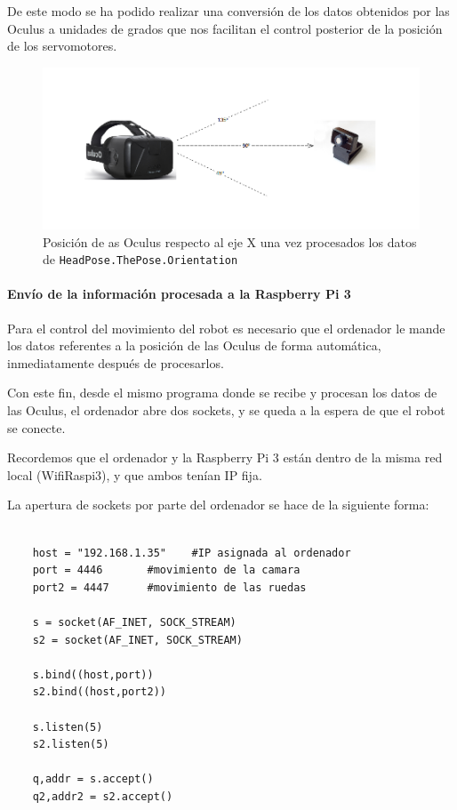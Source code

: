 \documentclass[twoside, 11pt]{epstfg}
\begin{document}
De este modo se ha podido realizar una conversión de los datos obtenidos por las Oculus a unidades de grados que nos facilitan el control posterior de la posición de los servomotores.

\begin{figure}[h!]
	\centerline{
		\mbox{\includegraphics[width=.80\textwidth]{images/Oculusgrados2.png}}
	}
	\caption{Posición de as Oculus respecto al eje X una vez procesados los datos de \texttt{HeadPose.ThePose.Orientation}}
\end{figure}
\newpage
\paragraph{Envío de la información procesada a la Raspberry Pi 3}



Para el control del movimiento del robot es necesario que el ordenador le mande los datos referentes a la posición de las Oculus de forma automática, inmediatamente después de procesarlos.

Con este fin, desde el mismo programa donde se recibe y procesan los datos de las Oculus, el ordenador abre dos sockets, y se queda a la espera de que el robot se conecte.

Recordemos que el ordenador y la Raspberry Pi 3 están dentro de la misma red local (WifiRaspi3), y que ambos tenían IP fija.

La apertura de sockets por parte del ordenador se hace de la siguiente forma:

\lstset{language=python, breaklines=true, basicstyle=\footnotesize}
\begin{lstlisting}[frame=single]

	host = "192.168.1.35"    #IP asignada al ordenador
	port = 4446       #movimiento de la camara
	port2 = 4447      #movimiento de las ruedas

	s = socket(AF_INET, SOCK_STREAM)
	s2 = socket(AF_INET, SOCK_STREAM)

	s.bind((host,port))
	s2.bind((host,port2))

	s.listen(5)
	s2.listen(5)

	q,addr = s.accept()
	q2,addr2 = s2.accept()

\end{lstlisting}
\end{document}
